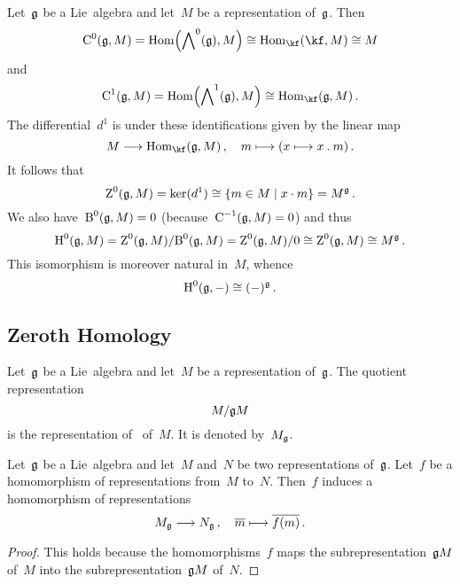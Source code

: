 \begin{fluff}
  \label{zeroth cohomology}
  Let~$\mathfrak{g}$ be a Lie~algebra and let~$M$ be a representation of~$\mathfrak{g}$.
  Then
  \[
    \Chain^0(\glie, M)
    =
    \Hom\Bigl( \Exterior^0(\glie), M \Bigr)
    \cong
    \Hom_{\kf}( \kf, M )
    \cong
    M
  \]
  and
  \[
    \Chain^1(\glie, M)
    =
    \Hom\Bigl( \Exterior^1(\glie), M \Bigr)
    \cong
    \Hom_{\kf}( \glie, M ) \,.
  \]
  The differential~$d^1$ is under these identifications given by the linear map
  \[
    M
    \to
    \Hom_{\kf}(\glie, M) \,,
    \quad
    m
    \mapsto
    ( x \mapsto x \act m ) \,.
  \]
  It follows that
  \[
    \Cycle^0(\glie, M)
    =
    \ker(d^1)
    \cong
    \{
      m \in M
    \suchthat
      x \cdot m
    \}
    =
    M^{\glie} \,.
  \]
  We also have~$\operatorname{B}^0(\mathfrak{g}, M) = 0$ (because~$\operatorname{C}^{-1}(\mathfrak{g}, M) = 0$) and thus
  \[
    \operatorname{H}^0(\mathfrak{g}, M)
    =
    \operatorname{Z}^0(\mathfrak{g}, M) / { \operatorname{B}^0(\mathfrak{g}, M) }
    =
    \operatorname{Z}^0(\mathfrak{g}, M) / 0
    \cong
    \operatorname{Z}^0(\mathfrak{g}, M)
    \cong
    M^{\mathfrak{g}} \,.
  \]
  This isomorphism is moreover natural in~$M$, whence
  \[
    \operatorname{H}^0(\mathfrak{g}, -)
    \cong
    (-)^{\mathfrak{g}} \,.
  \]
\end{fluff}



\subsection{Zeroth Homology}

\begin{definition}
  Let~$\mathfrak{g}$ be a Lie~algebra and let~$M$ be a representation of~$\mathfrak{g}$.
  The quotient representation
  \[
    M / \mathfrak{g} M
  \]
  is the representation of~ of~$M$.
  It is denoted by~$M_{\mathfrak{g}}$.
\end{definition}


\begin{proposition}
  \label{functoriality of coinvariants}
  Let~$\mathfrak{g}$ be a Lie~algebra and let~$M$ and~$N$ be two representations of~$\mathfrak{g}$.
  Let~$f$ be a homomorphism of representations from~$M$ to~$N$.
  Then~$f$ induces a homomorphism of representations
  \[
    M_{\glie}
    \to
    N_{\glie} \,,
    \quad
    \class{m}
    \mapsto
    \class{f(m)} \,.
  \]
\end{proposition}


\begin{proof}
  This holds because the homomorphisms~$f$ maps the subrepresentation~$\mathfrak{g} M$ of~$M$ into the subrepresentation~$\mathfrak{g} M$ of~$N$.
\end{proof}


